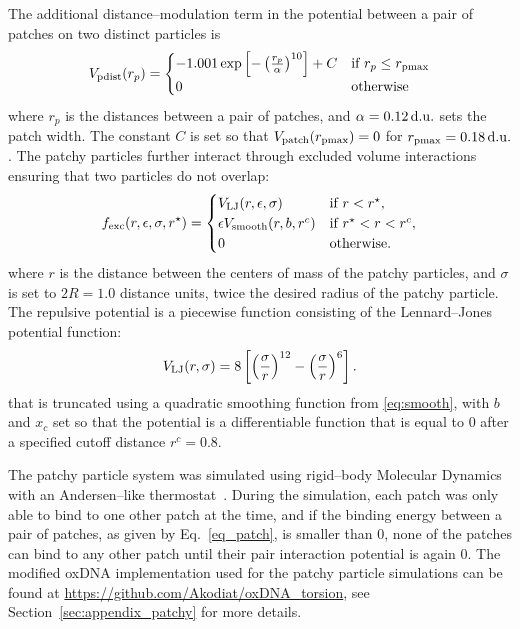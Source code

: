 The additional distance--modulation term in the potential between a pair of patches on two distinct particles is 
\begin{equation}
    \label{eq_patch}
    V_{\rm pdist}(r_p) =  \begin{cases} 
                          -1.001  \exp{\left[- \left( \frac{r_p}{\alpha} \right)^{10}\right]} + C & \text{if $r_p \leq r_{\rm pmax}  $} \\
                          0 & \text{otherwise}
                        \end{cases}
\end{equation}
where $r_p$ is the distances between a pair of patches, and $\alpha = 0.12\, {\rm d.u.}$ sets the patch width. The constant $C$ is set so that $V_{\rm patch}(r_{\rm pmax}) = 0$ for $r_{\rm pmax} = 0.18\, \rm{d.u.}$. The patchy particles further interact through excluded volume interactions ensuring that two particles do not overlap:
\begin{equation}
    f_{\rm exc}(r,\epsilon,\sigma,r^{\star}) = \begin{cases}
	V_{\rm LJ}(r, \epsilon, \sigma) & \text{if $r < r^{\star} $},\\
	\epsilon V_{\rm smooth} (r, b, r^c) & \text{if $r^{\star} < r < r^c$},\\
	0 & \text{otherwise}.
	\end{cases} 
\end{equation}
where $r$ is the distance between the centers of mass of the patchy particles, and $\sigma$ is set to $2R = 1.0$ distance units, twice the desired radius of the patchy particle.
The repulsive potential is a piecewise function consisting of the Lennard--Jones potential function:
\begin{equation} 
V_{\rm LJ}(r,  \sigma) = 8 \left[ \left(\frac{\sigma}{r}\right) ^{12} - \left(\frac{\sigma}{r}\right) ^{6} \right].
\end{equation}
that is truncated using a quadratic smoothing function from \eqref{eq:smooth}, with $b$ and $x_c$ set so that the potential is a differentiable function that is equal to $0$ after a specified cutoff distance $r^c = 0.8$.  

The patchy particle system was simulated using rigid--body Molecular Dynamics with an Andersen--like thermostat~\cite{russo2009reversible}. During the simulation, each patch was only able to bind to one other patch at the time, and if the binding energy between a pair of patches, as given by Eq.~\eqref{eq_patch}, is smaller than 0, none of the patches can bind to any other patch until their pair interaction potential is again 0.
The modified oxDNA implementation used for the patchy particle simulations can be found at \href{https://github.com/Akodiat/oxDNA_torsion}{https://github.com/Akodiat/oxDNA\_torsion}, see Section~\ref{sec:appendix_patchy} for more details.

